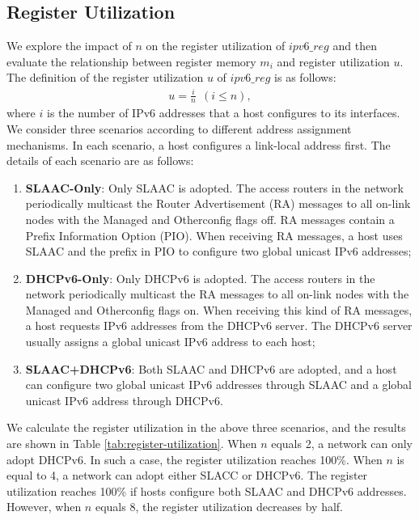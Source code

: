 \documentclass[a4paper,fleqn]{cas-dc}
\begin{document}
    \subsection{Register Utilization}
        We explore the impact of $n$ on the register utilization of $ipv6\_reg$ and then evaluate the relationship between register memory $m_i$ and register utilization $u$. The definition of the register utilization $u$ of $ipv6\_reg$ is as follows: 
        \begin{equation}
                \label{register-utilization-calculation}
                \begin{aligned}
                    u = \frac{i}{n}\ \ (i \leq n),
                \end{aligned}
        \end{equation}
        where $i$ is the number of IPv6 addresses that a host configures to its interfaces.
        We consider three scenarios according to different address assignment mechanisms. In each scenario, a host configures a link-local address first. The details of each scenario are as follows:
        \begin{enumerate}[1)]
            \item \textbf{SLAAC-Only}: Only SLAAC is adopted. The access routers in the network periodically multicast the Router Advertisement (RA) messages \cite{NDP} to all on-link nodes with the Managed and Otherconfig flags off. RA messages contain a Prefix Information Option (PIO). When receiving RA messages, a host uses SLAAC and the prefix in PIO to configure two global unicast IPv6 addresses;

            \item \textbf{DHCPv6-Only}: Only DHCPv6 is adopted. The access routers in the network periodically multicast the RA messages to all on-link nodes with the Managed and Otherconfig flags on. When receiving this kind of RA messages, a host requests IPv6 addresses from the DHCPv6 server. The DHCPv6 server usually assigns a global unicast IPv6 address to each host;

            \item \textbf{SLAAC+DHCPv6}: Both SLAAC and DHCPv6 are adopted, and a host can configure two global unicast IPv6 addresses through SLAAC and a global unicast IPv6 address through DHCPv6.
        \end{enumerate}
        We calculate the register utilization in the above three scenarios, and the results are shown in Table \ref{tab:register-utilization}. When $n$ equals 2, a network can only adopt DHCPv6. In such a case, the register utilization reaches 100\%. When $n$ is equal to 4, a network can adopt either SLACC or DHCPv6. The register utilization reaches 100\% if hosts configure both SLAAC and DHCPv6 addresses. However, when $n$ equals 8, the register utilization decreases by half.
\end{document}
